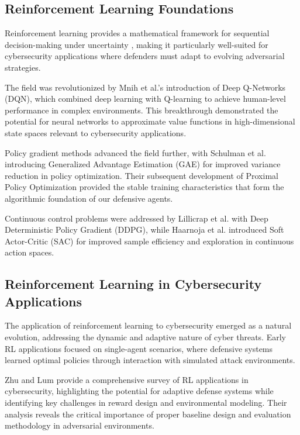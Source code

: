 \documentclass[12pt,oneside]{article}
\begin{document}
\subsection{Reinforcement Learning Foundations}

Reinforcement learning provides a mathematical framework for sequential decision-making under uncertainty \cite{sutton2018reinforcement}, making it particularly well-suited for cybersecurity applications where defenders must adapt to evolving adversarial strategies.

The field was revolutionized by Mnih et al.'s \cite{mnih2015human} introduction of Deep Q-Networks (DQN), which combined deep learning with Q-learning to achieve human-level performance in complex environments. This breakthrough demonstrated the potential for neural networks to approximate value functions in high-dimensional state spaces relevant to cybersecurity applications.

Policy gradient methods advanced the field further, with Schulman et al. \cite{schulman2015generalized} introducing Generalized Advantage Estimation (GAE) for improved variance reduction in policy optimization. Their subsequent development of Proximal Policy Optimization \cite{schulman2017proximal} provided the stable training characteristics that form the algorithmic foundation of our defensive agents.

Continuous control problems were addressed by Lillicrap et al. \cite{lillicrap2015continuous} with Deep Deterministic Policy Gradient (DDPG), while Haarnoja et al. \cite{haarnoja2018soft} introduced Soft Actor-Critic (SAC) for improved sample efficiency and exploration in continuous action spaces.

\subsection{Reinforcement Learning in Cybersecurity Applications}

The application of reinforcement learning to cybersecurity emerged as a natural evolution, addressing the dynamic and adaptive nature of cyber threats. Early RL applications focused on single-agent scenarios, where defensive systems learned optimal policies through interaction with simulated attack environments.

Zhu and Lum \cite{zhu2021survey} provide a comprehensive survey of RL applications in cybersecurity, highlighting the potential for adaptive defense systems while identifying key challenges in reward design and environmental modeling. Their analysis reveals the critical importance of proper baseline design and evaluation methodology in adversarial environments.
\end{document}
